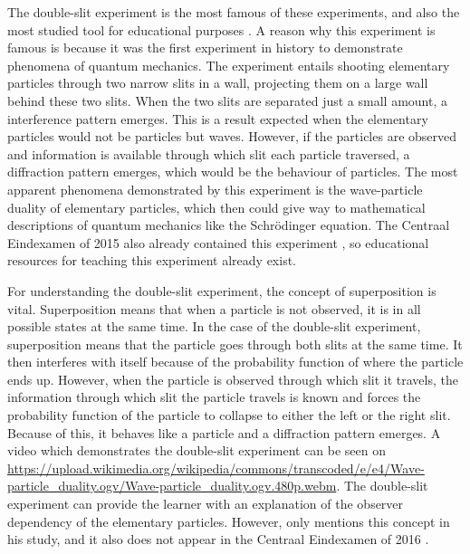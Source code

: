 \documentclass[11pt,twoside]{report} %
\begin{document}
The double-slit experiment is the most famous of these experiments, and also the most studied tool for educational purposes \cite{asikainen, henriksen, hobson, levrini, mckagan, muller, papaphotis1,singh2, thacker}. A reason why this experiment is famous is because it was the first experiment in history to demonstrate phenomena of quantum mechanics. The experiment entails shooting elementary particles through two narrow slits in a wall, projecting them on a large wall behind these two slits. When the two slits are separated just a small amount, a interference pattern emerges. This is a result expected when the elementary particles would not be particles but waves. However, if the particles are observed and information is available through which slit each particle traversed, a diffraction pattern emerges, which would be the behaviour of particles. The most apparent phenomena demonstrated by this experiment is the wave-particle duality of elementary particles, which then could give way to mathematical descriptions of quantum mechanics like the Schrödinger equation. The Centraal Eindexamen of 2015 also already contained this experiment \cite{eindexamen2015}, so educational resources for teaching this experiment already exist.

For understanding the double-slit experiment, the concept of superposition is vital. Superposition means that when a particle is not observed, it is in all possible states at the same time. In the case of the double-slit experiment, superposition means that the particle goes through both slits at the same time. It then interferes with itself because of the probability function of where the particle ends up. However, when the particle is observed through which slit it travels, the information through which slit the particle travels is known and forces the probability function of the particle to collapse to either the left or the right slit. Because of this, it behaves like a particle and a diffraction pattern emerges. A video which demonstrates the double-slit experiment can be seen on \url{https://upload.wikimedia.org/wikipedia/commons/transcoded/e/e4/Wave-particle_duality.ogv/Wave-particle_duality.ogv.480p.webm}. The double-slit experiment can provide the learner with an explanation of the observer dependency of the elementary particles. However, only  mentions this concept in his study, and it also does not appear in the Centraal Eindexamen of 2016 \cite{eindexamen2016}.
\end{document}

